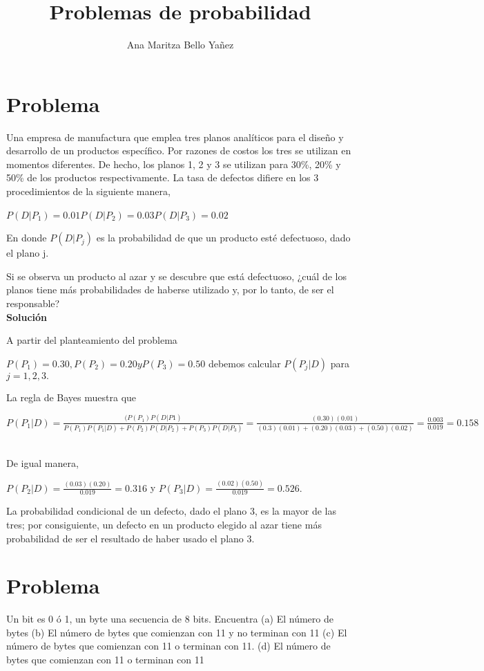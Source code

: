 \documentclass[12pt]{article}
\begin{document}
\title{Problemas de probabilidad}
\author{Ana Maritza Bello Yañez}
\maketitle
\setlength{\parindent}{0pt}
\setlength{\parskip}{1em}

\section{Problema}
Una empresa de manufactura que emplea tres planos analíticos para el diseño y
desarrollo de un productos específico. Por razones de costos los tres se
utilizan en momentos diferentes. De hecho, los planos 1, 2 y 3 se utilizan para
30\%, 20\% y 50\% de los productos respectivamente. La tasa de defectos difiere
en los 3 procedimientos de la siguiente manera,\

$P(D|P_1)=0.01 P(D|P_2)=0.03 P(D|P_3)=0.02 $ \

En donde $P(D|P_j)$ es la probabilidad de que un producto esté defectuoso, dado
el plano j.\

Si se observa un producto al azar y se descubre que está defectuoso, ¿cuál de
los planos tiene más probabilidades de haberse utilizado y, por lo tanto, de ser
el responsable?\\

\textbf{Solución} \

A partir del planteamiento del problema \

$P(P_1)=0.30, P(P_2)=0.20 y P(P_3)=0.50$ debemos calcular $P(P_j|D)$ para $j =
1, 2, 3.$

La regla de Bayes muestra que\

$P(P_1|D)=\frac{(P(P_1)P(D|P1)}{P(P_1)P(P_1|D)+P(P_2)P(D|P_2)+P(P_3)P(D|P_3)} =
\frac{(0.30)(0.01)}{(0.3)(0.01)+(0.20)(0.03)+(0.50)(0.02)}=\frac{0.003}{0.019}=0.158$\ 

De igual manera,\

$P(P_2|D) = \frac{(0.03)(0.20)}{0.019} = 0.316$ y
$P(P_3|D)=\frac{(0.02)(0.50)}{0.019}=0.526.$\

La probabilidad condicional de un defecto, dado el plano 3, es la mayor de las
tres; por consiguiente, un defecto en un producto elegido al azar tiene más
probabilidad de ser el resultado de haber usado el plano 3.

\section{Problema}
Un bit es 0 ó 1, un byte una secuencia de 8 bits. Encuentra (a) El número de
bytes (b) El número de bytes que comienzan con 11 y no terminan con 11 (c) El
número de bytes que comienzan con 11 o terminan con 11. (d) El número de bytes
que comienzan con 11 o terminan con 11
\end{document}
